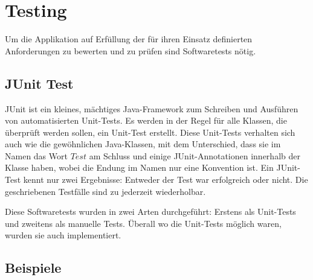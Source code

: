 \section{Testing}
Um die Applikation auf Erfüllung der für ihren Einsatz definierten Anforderungen zu bewerten und zu prüfen sind Softwaretests nötig. 

\subsection{JUnit Test}
JUnit ist ein kleines, mächtiges Java-Framework zum Schreiben und Ausführen von automatisierten Unit-Tests. Es werden in der Regel für alle Klassen, die überprüft werden sollen, ein Unit-Test erstellt. Diese Unit-Tests verhalten sich auch wie die gewöhnlichen Java-Klassen, mit dem Unterschied, dass sie im Namen das Wort $Test$ am Schluss und einige JUnit-Annotationen innerhalb der Klasse haben, wobei die Endung im Namen nur eine Konvention ist. Ein JUnit-Test kennt nur zwei Ergebnisse: Entweder der Test war erfolgreich oder nicht. Die geschriebenen Testfälle sind zu jederzeit wiederholbar. 

Diese Softwaretests wurden in zwei Arten durchgeführt: Erstens als Unit-Tests und zweitens als manuelle Tests. Überall wo die Unit-Tests möglich waren, wurden sie auch implementiert.
\subsection{Beispiele}
